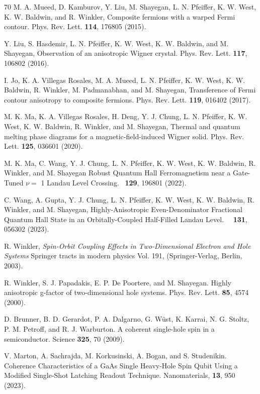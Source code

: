 \documentclass[reprint,amsmath,amssymb,aps,prl,nobibnotes,superscriptaddress]{revtex4-1}
\begin{document}
\begin{thebibliography}{70}
 M. A. Mueed, D. Kamburov, Y. Liu, M. Shayegan, L. N.
Pfeiffer, K. W. West, K. W. Baldwin, and R. Winkler, Composite fermions with a warped Fermi contour. Phys.
Rev. Lett. \textbf{114}, 176805 (2015).

Y. Liu, S. Hasdemir, L. N. Pfeiffer, K. W. West, K. W.
Baldwin, and M. Shayegan, Observation of an anisotropic
Wigner crystal. Phys. Rev. Lett. \textbf{117}, 106802 (2016).

 I. Jo, K. A. Villegas Rosales, M. A. Mueed, L. N. Pfeiffer,
K. W. West, K. W. Baldwin, R. Winkler, M. Padmanabhan, and M. Shayegan, Transference of Fermi contour
anisotropy to composite fermions. Phys. Rev. Lett. \textbf{119},
016402 (2017).

 M. K. Ma, K. A. Villegas Rosales, H. Deng, Y. J. Chung,
L. N. Pfeiffer, K. W. West, K. W. Baldwin, R. Winkler, and M. Shayegan, Thermal and quantum melting phase diagrams for a magnetic-field-induced Wigner solid. Phys. Rev. Lett. \textbf{125}, 036601 (2020).

M. K. Ma, C. Wang, Y. J. Chung, L. N. Pfeiffer, K. W. West, K. W. Baldwin, R. Winkler, and M. Shayegan Robust Quantum Hall Ferromagnetism near a Gate-Tuned $\nu=$ 1 Landau Level Crossing. \prl \ \textbf{129}, 196801 (2022).

 C. Wang, A. Gupta, Y. J. Chung, L. N. Pfeiffer, K. W. West, K. W. Baldwin, R. Winkler, and M. Shayegan, Highly-Anisotropic Even-Denominator Fractional Quantum Hall State in an Orbitally-Coupled Half-Filled Landau Level. \prl\ \ \textbf{131}, 056302 (2023).

 R. Winkler, \textit{Spin-Orbit Coupling Effects in Two-Dimensional Electron and Hole Systems} Springer tracts
in modern physics Vol. 191, (Springer-Verlag, Berlin,
2003).

 R. Winkler, S. J. Papadakis, E. P. De Poortere, and M. Shayegan. Highly anisotropic g-factor of two-dimensional hole systems. Phys. Rev. Lett. \textbf{85}, 4574 (2000).

 D. Brunner, B. D. Gerardot, P. A. Dalgarno, G. Wüst, K. Karrai, N. G. Stoltz, P. M. Petroff, and R. J. Warburton. A
coherent single-hole spin in a semiconductor. Science \textbf{325}, 70 (2009).

 V. Marton, A. Sachrajda, M. Korkusinski, A. Bogan, and S. Studenikin. Coherence Characteristics of a GaAs Single Heavy-Hole Spin Qubit Using a Modified Single-Shot Latching Readout Technique. Nanomaterials, \textbf{13}, 950 (2023). 


\end{thebibliography}
\end{document}
